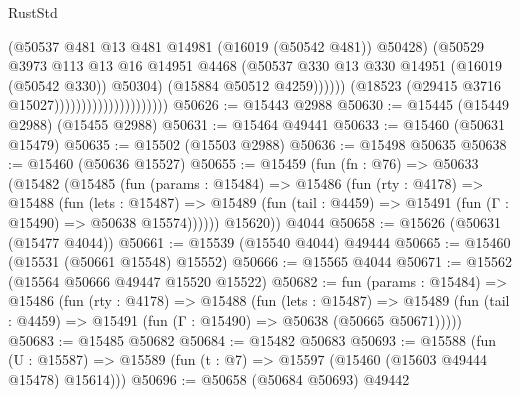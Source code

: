 \begin{lexlean}{RustStd}
\begin{coremodule}
                                                  (@50537
                                                    @481
                                                    @13
                                                    @481
                                                    @14981
                                                    (@16019 (@50542 @481))
                                                    @50428)
                                                  (@50529
                                                    @3973
                                                    @113
                                                    @13
                                                    @16
                                                    @14951
                                                    @4468
                                                    (@50537
                                                      @330
                                                      @13
                                                      @330
                                                      @14951
                                                      (@16019 (@50542 @330))
                                                      @50304)
                                                    (@15884 @50512 @4259))))))
                                          (@18523 (@29415 @3716 @15027)))))))))))))))))))))
@50626 := @15443 @2988
@50630 := @15445 (@15449 @2988) (@15455 @2988)
@50631 := @15464 @49441
@50633 := @15460 (@50631 @15479)
@50635 := @15502 (@15503 @2988)
@50636 := @15498 @50635
@50638 := @15460 (@50636 @15527)
@50655 := @15459
    (fun (fn : @76) =>
    @50633
      (@15482
        (@15485
          (fun (params : @15484) =>
          @15486
            (fun (rty : @4178) =>
            @15488
              (fun (lets : @15487) =>
              @15489 (fun (tail : @4459) => @15491 (fun (Γ : @15490) => @50638 @15574))))))
        @15620))
    @4044
@50658 := @15626 (@50631 (@15477 @4044))
@50661 := @15539 (@15540 @4044) @49444
@50665 := @15460 (@15531 (@50661 @15548) @15552)
@50666 := @15565 @4044
@50671 := @15562 (@15564 @50666 @49447 @15520 @15522)
@50682 := fun (params : @15484) =>
  @15486
    (fun (rty : @4178) =>
    @15488
      (fun (lets : @15487) =>
      @15489 (fun (tail : @4459) => @15491 (fun (Γ : @15490) => @50638 (@50665 @50671)))))
@50683 := @15485 @50682
@50684 := @15482 @50683
@50693 := @15588
    (fun (U : @15587) => @15589 (fun (t : @7) => @15597 (@15460 (@15603 @49444 @15478) @15614)))
@50696 := @50658 (@50684 @50693) @49442

\end{coremodule}
\end{lexlean}
